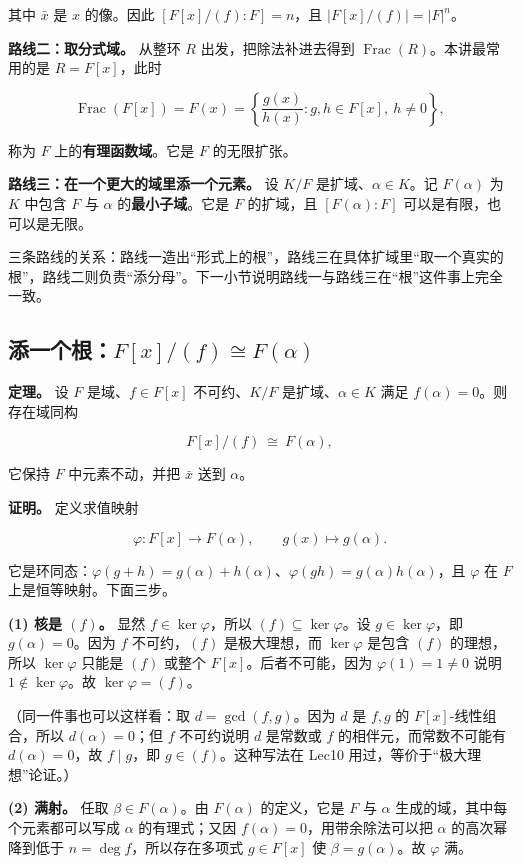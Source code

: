 其中 $\bar x$ 是 $x$ 的像。因此 $[F[x]/(f):F]=n$，且 $|F[x]/(f)|=|F|^n$。

\textbf{路线二：取分式域。} 从整环 $R$ 出发，把除法补进去得到 $\operatorname{Frac}(R)$。本讲最常用的是 $R=F[x]$，此时

\[
\operatorname{Frac}(F[x])=F(x)=\left\{\frac{g(x)}{h(x)}:g,h\in F[x],\ h\ne0\right\},
\]

称为 $F$ 上的\textbf{有理函数域}。它是 $F$ 的无限扩张。

\textbf{路线三：在一个更大的域里添一个元素。} 设 $K/F$ 是扩域、$\alpha\in K$。记 $F(\alpha)$ 为 $K$ 中包含 $F$ 与 $\alpha$ 的\textbf{最小子域}。它是 $F$ 的扩域，且 $[F(\alpha):F]$ 可以是有限，也可以是无限。

三条路线的关系：路线一造出“形式上的根”，路线三在具体扩域里“取一个真实的根”，路线二则负责“添分母”。下一小节说明路线一与路线三在“根”这件事上完全一致。

\subsection{添一个根：$F[x]/(f)\cong F(\alpha)$}


\textbf{定理。} 设 $F$ 是域、$f\in F[x]$ 不可约、$K/F$ 是扩域、$\alpha\in K$ 满足 $f(\alpha)=0$。则存在域同构

\[
F[x]/(f)\ \cong\ F(\alpha),
\]

它保持 $F$ 中元素不动，并把 $\bar x$ 送到 $\alpha$。

\textbf{证明。} 定义求值映射

\[
\varphi:F[x]\longrightarrow F(\alpha),\qquad g(x)\longmapsto g(\alpha).
\]

它是环同态：$\varphi(g+h)=g(\alpha)+h(\alpha)$、$\varphi(gh)=g(\alpha)h(\alpha)$，且 $\varphi$ 在 $F$ 上是恒等映射。下面三步。

\textbf{(1) 核是 $(f)$。} 显然 $f\in\ker\varphi$，所以 $(f)\subseteq\ker\varphi$。设 $g\in\ker\varphi$，即 $g(\alpha)=0$。因为 $f$ 不可约，$(f)$ 是极大理想，而 $\ker\varphi$ 是包含 $(f)$ 的理想，所以 $\ker\varphi$ 只能是 $(f)$ 或整个 $F[x]$。后者不可能，因为 $\varphi(1)=1\ne0$ 说明 $1\notin\ker\varphi$。故 $\ker\varphi=(f)$。

（同一件事也可以这样看：取 $d=\gcd(f,g)$。因为 $d$ 是 $f,g$ 的 $F[x]$-线性组合，所以 $d(\alpha)=0$；但 $f$ 不可约说明 $d$ 是常数或 $f$ 的相伴元，而常数不可能有 $d(\alpha)=0$，故 $f\mid g$，即 $g\in(f)$。这种写法在 Lec10 用过，等价于“极大理想”论证。）

\textbf{(2) 满射。} 任取 $\beta\in F(\alpha)$。由 $F(\alpha)$ 的定义，它是 $F$ 与 $\alpha$ 生成的域，其中每个元素都可以写成 $\alpha$ 的有理式；又因 $f(\alpha)=0$，用带余除法可以把 $\alpha$ 的高次幂降到低于 $n=\deg f$，所以存在多项式 $g\in F[x]$ 使 $\beta=g(\alpha)$。故 $\varphi$ 满。

